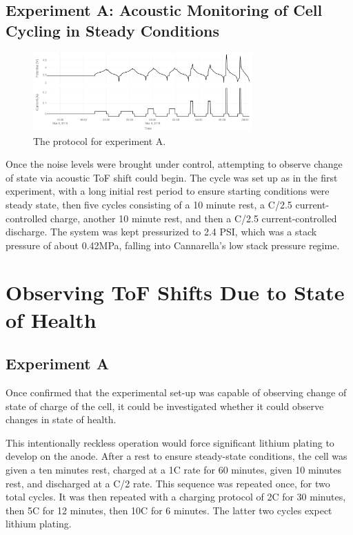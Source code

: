 \subsection{Experiment A: Acoustic Monitoring of Cell Cycling in Steady Conditions}
\begin{figure}[t]\label{fig:neware0309}
    \includegraphics[width=0.75\textwidth]{Thesis/neware0309.PNG}
    \centering
    \caption{The protocol for experiment A.}
\end{figure}
Once the noise levels were brought under control, attempting to observe change of state via acoustic ToF shift could begin. The cycle was set up as in the first experiment, with a long initial rest period to ensure starting conditions were steady state, then five cycles consisting of a 10 minute rest, a C/2.5 current-controlled charge, another 10 minute rest, and then a C/2.5 current-controlled discharge. 
The system was kept pressurized to 2.4 PSI, which was a stack pressure of about 0.42MPa, falling into Cannarella's low stack pressure regime.

\section{Observing ToF Shifts Due to State of Health} 
\subsection{Experiment A}
Once confirmed that the experimental set-up was capable of observing change of state of charge of the cell, it could be investigated whether it could observe changes in state of health.

This intentionally reckless operation would force significant lithium plating to develop on the anode. 
After a rest to ensure steady-state conditions, the cell was given a ten minutes rest, charged at a 1C rate for 60 minutes, given 10 minutes rest, and discharged at a C/2 rate. 
This sequence was repeated once, for two total cycles. 
It was then repeated with a charging protocol of 2C for 30 minutes, then 5C for 12 minutes, then 10C for 6 minutes. 
The latter two cycles expect lithium plating.

